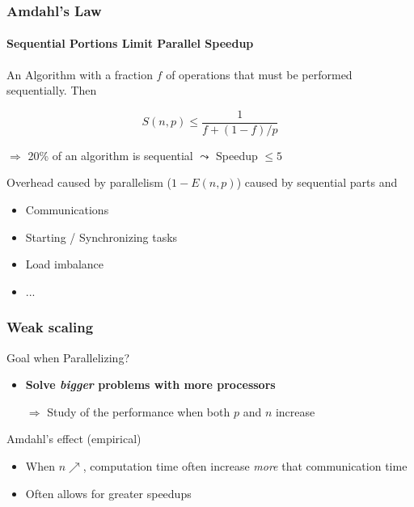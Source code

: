 \documentclass[xcolor={x11names,svgnames,psnames}]{beamer}
\begin{document}

\begin{frame}
  \frametitle{Amdahl's Law}
  \framesubtitle{Sequential Portions Limit Parallel Speedup}

  An Algorithm with a fraction $f$ of operations that must be performed
  sequentially. Then

\[
  S(n,p)  \leq  \frac{1}{f + (1 - f)/p}
\]

$\Rightarrow$ 20\% of an algorithm is sequential $\leadsto$ Speedup $\leq 5$

\bigskip

Overhead caused by parallelism ($1 - E(n,p)$) 
caused by sequential parts and
\begin{itemize}
\item Communications
\item Starting / Synchronizing tasks 
\item Load imbalance
\item ...
\end{itemize}

\end{frame}

\begin{frame}
\frametitle{Weak scaling}

\begin{alertblock}{Goal when Parallelizing?}
  \begin{itemize}
  \item \textbf{Solve \emph{bigger} problems with more processors}
  \item[$\Rightarrow$] Study of the performance when both $p$ and $n$ increase
  \end{itemize}
\end{alertblock}

\medskip

\begin{exampleblock}{Amdahl's effect (empirical)}
\begin{itemize}
\item When $n \nearrow$, computation time often increase \emph{more} that communication time
\item Often allows for greater speedups
\end{itemize}
\end{exampleblock}
\end{frame}

\end{document}
